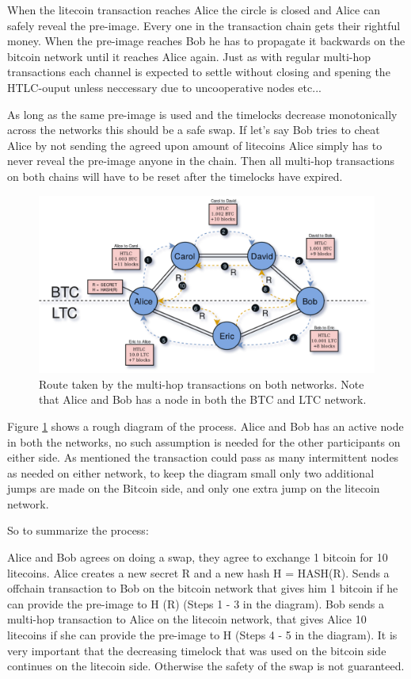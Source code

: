 When the litecoin transaction reaches Alice the circle is closed and Alice can safely reveal the pre-image. Every one in the transaction chain gets their rightful money. When the pre-image reaches Bob he has to propagate it backwards on the bitcoin network until it reaches Alice again. Just as with regular multi-hop transactions each channel is expected to settle without closing and spening the HTLC-ouput unless neccessary due to uncooperative nodes etc... 

As long as the same pre-image is used and the timelocks decrease monotonically across the networks this should be a safe swap. If let's say Bob tries to cheat Alice by not sending the agreed upon amount of litecoins Alice simply has to never reveal the pre-image anyone in the chain. Then all multi-hop transactions on both chains will have to be reset after the timelocks have expired.

\begin{figure}[H]
	\centering
	\includegraphics[width=1\textwidth]{background/images/ln_route_swap.png}
	\caption{Route taken by the multi-hop transactions on both networks. Note that Alice and Bob has a node in both the BTC and LTC network.}
	\label{fig:ln-swap}
\end{figure}

Figure \ref{fig:ln-swap} shows a rough diagram of the process. Alice and Bob has an active node in both the networks, no such assumption is needed for the other participants on either side. As mentioned the transaction could pass as many intermittent nodes as needed on either network, to keep the diagram small only two additional jumps are made on the Bitcoin side, and only one extra jump on the litecoin network.  

So to summarize the process: 

Alice and Bob agrees on doing a swap, they agree to exchange 1 bitcoin for 10 litecoins. Alice creates a new secret R and a new hash H = HASH(R). Sends a offchain transaction to Bob on the bitcoin network that gives him 1 bitcoin if he can provide the pre-image to H (R) (Steps 1 - 3 in the diagram). Bob sends a multi-hop transaction to Alice on the litecoin network, that gives Alice 10 litecoins if she can provide the pre-image to H (Steps 4 - 5 in the diagram). It is very important that the decreasing timelock that was used on the bitcoin side continues on the litecoin side. Otherwise the safety of the swap is not guaranteed. 

